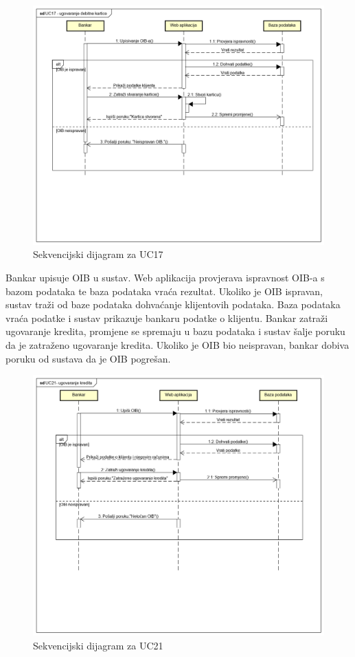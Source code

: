 			\begin{figure}[H]
				\includegraphics[scale=0.60]{slike/UC17.PNG}
				\centering
				\caption{Sekvencijski dijagram za UC17}
				\label{fig:uc17}
			\end{figure}
			\eject
			
			
			
			Bankar upisuje OIB u sustav. Web aplikacija provjerava ispravnost OIB-a s bazom podataka te baza podataka vraća rezultat. Ukoliko je OIB ispravan, sustav traži od baze podataka dohvaćanje klijentovih podataka. Baza podataka vraća podatke i sustav prikazuje bankaru podatke o klijentu. Bankar zatraži ugovaranje kredita, promjene se spremaju u bazu podataka i sustav šalje poruku da je zatraženo ugovaranje kredita. Ukoliko je OIB bio neispravan, bankar dobiva poruku od sustava da je OIB pogrešan.
			\eject
			
			\begin{figure}[H]
				\includegraphics[scale=0.60]{slike/UC21.PNG}
				\centering
				\caption{Sekvencijski dijagram za UC21}
				\label{fig:uc21}
			\end{figure}
			\eject
			

